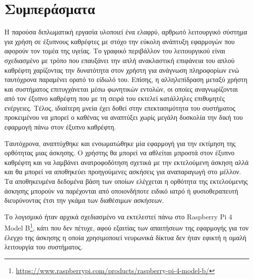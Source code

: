 \section{Συμπεράσματα}
\label{sec:conclusions}

Η παρούσα διπλωματική εργασία υλοποιεί ένα ελαφρύ, αρθρωτό λειτουργικό σύστημα για χρήση σε έξυπνους καθρέφτες με στόχο την εύκολη ανάπτυξη εφαρμογών που αφορούν τον τομέα της υγείας. Το γραφικό περιβάλλον του λειτουργικού είναι σχεδιασμένο με τρόπο που επαυξάνει την απλή ανακλαστική επιφάνεια του απλού καθρέφτη χαρίζοντας την δυνατότητα στον χρήστη για ανάγνωση πληροφορίων ενώ ταυτόχρονα παραμένει ορατό το είδωλό του. Επίσης, η αλληλεπίδραση μεταξύ χρήστη και συστήματος επιτυγχάνεται μέσω φωνητικών εντολών, οι οποίες αναγνωρίζονται από τον έξυπνο καθρέφτη που με τη σειρά του εκτελεί κατάλληλες επιθυμητές ενέργειες. Τέλος, ιδιαίτερη μνεία έχει δοθεί στην επεκτασιμότητα του συστήματος προκειμένου να μπορεί ο καθένας να αναπτύξει χωρίς μεγάλη δυσκολία την δική του εφαρμογή πάνω στον έξυπνο καθρέφτη.

Ταυτόχρονα, αναπτύχθηκε και ενσωματώθηκε μία εφαρμογή για την εκτίμηση της ορθότητας μιας άσκησης. Ο χρήστης θα μπορεί να αθλείται μπροστά στον έξυπνο καθρέφτη και να λαμβάνει ανατροφοδότηση σχετικά με την εκτελούμενη άσκηση αλλά και θα μπορεί να αποθηκεύει προηγούμενες ασκήσεις για αναπαραγωγή στο μέλλον. Τα αποθηκευμένα δεδομένα βάση των οποίων ελέγχεται η ορθότητα της εκτελούμενης άσκησης μπορούν να παρέχονται από οποιονδήποτε ειδικό ιατρό ή φυσιοθεραπευτή διευρύνοντας έτσι την γκάμα των διαθέσιμων ασκήσεων.

Το λογισμικό ήταν αρχικά σχεδιασμένο να εκτελεστεί πάνω στο Raspberry Pi 4 Model B\footnote{\href{https://www.raspberrypi.com/products/raspberry-pi-4-model-b/}{https://www.raspberrypi.com/products/raspberry-pi-4-model-b/}}, κάτι που δεν πέτυχε, αφού εξαιτίας των απαιτήσεων της εφαρμογής για τον έλεγχο της άσκησης η οποία χρησιμοποιεί νευρωνικά δίκτυα δεν ήταν εφικτή η ομαλή λειτουργία του συστήματος.

